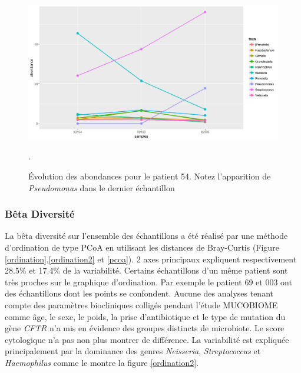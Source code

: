 \documentclass[12pt,a4paper]{article}
\begin{document}
\begin{figure}
\begin{center}
\includegraphics[scale=0.60]{img/curve_054.png}\hfill
\end{center}
\caption{Évolution des abondances pour le patient 54. Notez l'apparition de \textit{Pseudomonas} dans le dernier échantillon}.
\label{evolution54}
\end{figure}

\subsubsection{Bêta Diversité}
La bêta diversité sur l’ensemble des échantillons a été réalisé par une méthode d’ordination de type PCoA en utilisant les distances de Bray-Curtis (Figure \ref{ordination},\ref{ordination2} et \ref{pcoa}).
2 axes principaux expliquent respectivement 28.5\% et 17.4\% de la variabilité.
Certains échantillons d’un même patient sont très proches sur le graphique d’ordination. Par exemple le patient 69 et 003 ont des échantillons dont les points se confondent.
Aucune des analyses tenant compte des paramètres biocliniques colligés pendant l'étude MUCOBIOME comme âge, le sexe, le poids, la prise d'antibiotique et le type de mutation du gène \textit{CFTR} n’a mis en évidence des groupes distincts de microbiote. Le score cytologique n'a pas non plus montrer de différence.
La variabilité est expliquée principalement par la dominance des genres \textit{Neisseria}, \textit{Streptococcus} et \textit{Haemophilus} comme le montre la figure \ref{ordination2}.
\end{document}
